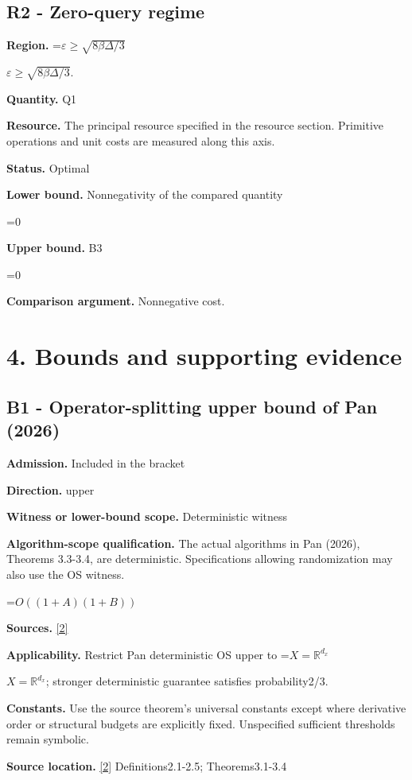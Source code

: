 \documentclass[10pt,a4paper]{article}
\newcommand{\AtlasMath}[1]{\par\begingroup\centering\setbox0=\hbox{$\displaystyle #1$}\ifdim\wd0>1.4\linewidth\typeout{ATLAS WIDE FORMULA: \the\wd0}\fi\ifdim\wd0>\linewidth\resizebox{\linewidth}{!}{\box0}\else\box0\fi\par\endgroup}
\newcommand{\AtlasInlineMath}[1]{\begingroup\setbox0=\hbox{$#1$}\ifdim\wd0>.4\linewidth\endgroup\AtlasMath{#1}\else\endgroup$#1$\fi}
\begin{document}
\subsection{R2 - Zero-query regime}
\textbf{Region.} \AtlasInlineMath{\varepsilon\ge\sqrt{8\beta\Delta/3}}.

\textbf{Quantity.} Q1

\textbf{Resource.} The principal resource specified in the resource section. Primitive operations and unit costs are measured along this axis.

\textbf{Status.} Optimal

\textbf{Lower bound.} Nonnegativity of the compared quantity

\AtlasMath{0}
\textbf{Upper bound.} B3

\AtlasMath{0}
\textbf{Comparison argument.} Nonnegative cost.

\section{4. Bounds and supporting evidence}
\subsection{B1 - Operator-splitting upper bound of Pan (2026)}
\textbf{Admission.} Included in the bracket

\textbf{Direction.} upper

\textbf{Witness or lower-bound scope.} Deterministic witness

\textbf{Algorithm-scope qualification.} The actual algorithms in Pan (2026), Theorems 3.3-3.4, are deterministic. Specifications allowing randomization may also use the OS witness.

\AtlasMath{O((1+A)(1+B))}
\textbf{Sources.} \href{https://arxiv.org/pdf/2609.14235v2}{[2]}

\textbf{Applicability.} Restrict Pan deterministic OS upper to \AtlasInlineMath{X=\mathbb R^{d_x}}; stronger deterministic guarantee satisfies probability2/3.

\textbf{Constants.} Use the source theorem’s universal constants except where derivative order or structural budgets are explicitly fixed. Unspecified sufficient thresholds remain symbolic.

\textbf{Source location.} \href{https://arxiv.org/pdf/2609.14235v2}{[2]} Definitions2.1-2.5; Theorems3.1-3.4
\end{document}
